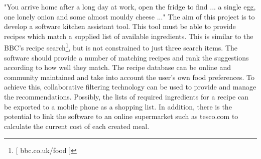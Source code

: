 "You arrive home after a long day at work, open the fridge to find ... a single egg, one lonely onion and some almost mouldy cheese ..." The aim of this project is to develop a software kitchen assistant tool. This tool must be able to provide recipes which match a supplied list of available ingredients. This is similar to the BBC's recipe search\footnote{[ bbc.co.uk/food ]}, but is not constrained to just three search items. The software should provide a number of matching recipes and rank the suggestions according to how well they match. The recipe database can be online and community maintained and take into account the user's own food preferences. To achieve this, collaborative filtering technology can be used to provide and manage the recommendations. Possibly, the lists of required ingredients for a recipe can be exported to a mobile phone as a shopping list. In addition, there is the potential to link the software to an online supermarket such as tesco.com to calculate the current cost of each created meal.